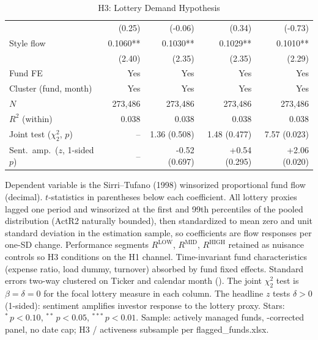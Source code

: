 \begin{table}[!htbp]
{\begin{tabular*}{\linewidth}{@{\extracolsep{\fill}}lrrrr}
 & (0.25) & (-0.06) & (0.34) & (-0.73)\\
Style flow & 0.1060** & 0.1030** & 0.1029** & 0.1010**\\
 & (2.40) & (2.35) & (2.35) & (2.29)\\
\midrule
Fund FE & Yes & Yes & Yes & Yes\\
Cluster (fund, month) & Yes & Yes & Yes & Yes\\
$N$ & 273,486 & 273,486 & 273,486 & 273,486\\
$R^2$ (within) & 0.038 & 0.038 & 0.038 & 0.038\\
Joint test ($\chi^2_2$, $p$) & -- & 1.36 (0.508) & 1.48 (0.477) & 7.57 (0.023)\\
Sent.\ amp.\ ($z$, 1-sided $p$) & -- & -0.52 (0.697) & +0.54 (0.295) & +2.06 (0.020)\\
\bottomrule
\end{tabular*}%
}\sbefit
\fi
\setlength{\tabletempwidth}{\wd\tabletempbox}
\ifdim\tabletempwidth>\linewidth\setlength{\tabletempwidth}{\linewidth}\fi
\begin{minipage}{\tabletempwidth}
\captionsetup{width=\linewidth}
\caption{H3: Lottery Demand Hypothesis}\label{tab:H3_regression}
\ifdim\wd\tabletempbox>\linewidth
  \resizebox{\linewidth}{!}{\usebox{\tabletempbox}}
\else
  \usebox{\tabletempbox}
\fi
\par\medskip
\begin{singlespace}\tablefont\noindent
Dependent variable is the Sirri--Tufano (1998) winsorized proportional fund flow (decimal). $t$-statistics in parentheses below each coefficient. All lottery proxies lagged one period and winsorized at the first and 99th percentiles of the pooled distribution (ActR2 naturally bounded), then standardized to mean zero and unit standard deviation in the estimation sample, so coefficients are flow responses per one-SD change. Performance segments $R^{\text{LOW}}$, $R^{\text{MID}}$, $R^{\text{HIGH}}$ retained as nuisance controls so H3 conditions on the H1 channel. Time-invariant fund characteristics (expense ratio, load dummy, turnover) absorbed by fund fixed effects. Standard errors two-way clustered on Ticker and calendar month (\textcite{Petersen2009}). The joint $\chi^2_2$ test is $\beta=\delta=0$ for the focal lottery measure in each column. The headline $z$ tests $\delta>0$ (1-sided): sentiment amplifies investor response to the lottery proxy. Stars: $^{*}\,p<0.10$, $^{**}\,p<0.05$, $^{***}\,p<0.01$. Sample: actively managed funds, \textcite{Evans2010}-corrected panel, no date cap; H3 / activeness subsample per flagged\_funds.xlsx.
\end{singlespace}
\end{minipage}
\end{table}

